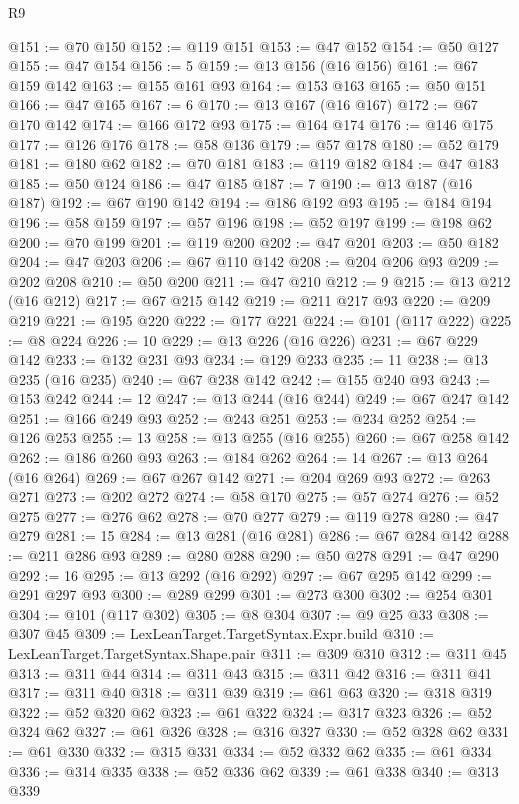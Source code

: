 \begin{lexlean}{R9}
\begin{coremodule}
@151 := @70 @150
@152 := @119 @151
@153 := @47 @152
@154 := @50 @127
@155 := @47 @154
@156 := 5
@159 := @13 @156 (@16 @156)
@161 := @67 @159 @142
@163 := @155 @161 @93
@164 := @153 @163
@165 := @50 @151
@166 := @47 @165
@167 := 6
@170 := @13 @167 (@16 @167)
@172 := @67 @170 @142
@174 := @166 @172 @93
@175 := @164 @174
@176 := @146 @175
@177 := @126 @176
@178 := @58 @136
@179 := @57 @178
@180 := @52 @179
@181 := @180 @62
@182 := @70 @181
@183 := @119 @182
@184 := @47 @183
@185 := @50 @124
@186 := @47 @185
@187 := 7
@190 := @13 @187 (@16 @187)
@192 := @67 @190 @142
@194 := @186 @192 @93
@195 := @184 @194
@196 := @58 @159
@197 := @57 @196
@198 := @52 @197
@199 := @198 @62
@200 := @70 @199
@201 := @119 @200
@202 := @47 @201
@203 := @50 @182
@204 := @47 @203
@206 := @67 @110 @142
@208 := @204 @206 @93
@209 := @202 @208
@210 := @50 @200
@211 := @47 @210
@212 := 9
@215 := @13 @212 (@16 @212)
@217 := @67 @215 @142
@219 := @211 @217 @93
@220 := @209 @219
@221 := @195 @220
@222 := @177 @221
@224 := @101 (@117 @222)
@225 := @8 @224
@226 := 10
@229 := @13 @226 (@16 @226)
@231 := @67 @229 @142
@233 := @132 @231 @93
@234 := @129 @233
@235 := 11
@238 := @13 @235 (@16 @235)
@240 := @67 @238 @142
@242 := @155 @240 @93
@243 := @153 @242
@244 := 12
@247 := @13 @244 (@16 @244)
@249 := @67 @247 @142
@251 := @166 @249 @93
@252 := @243 @251
@253 := @234 @252
@254 := @126 @253
@255 := 13
@258 := @13 @255 (@16 @255)
@260 := @67 @258 @142
@262 := @186 @260 @93
@263 := @184 @262
@264 := 14
@267 := @13 @264 (@16 @264)
@269 := @67 @267 @142
@271 := @204 @269 @93
@272 := @263 @271
@273 := @202 @272
@274 := @58 @170
@275 := @57 @274
@276 := @52 @275
@277 := @276 @62
@278 := @70 @277
@279 := @119 @278
@280 := @47 @279
@281 := 15
@284 := @13 @281 (@16 @281)
@286 := @67 @284 @142
@288 := @211 @286 @93
@289 := @280 @288
@290 := @50 @278
@291 := @47 @290
@292 := 16
@295 := @13 @292 (@16 @292)
@297 := @67 @295 @142
@299 := @291 @297 @93
@300 := @289 @299
@301 := @273 @300
@302 := @254 @301
@304 := @101 (@117 @302)
@305 := @8 @304
@307 := @9 @25 @33
@308 := @307 @45
@309 := LexLeanTarget.TargetSyntax.Expr.build
@310 := LexLeanTarget.TargetSyntax.Shape.pair
@311 := @309 @310
@312 := @311 @45
@313 := @311 @44
@314 := @311 @43
@315 := @311 @42
@316 := @311 @41
@317 := @311 @40
@318 := @311 @39
@319 := @61 @63
@320 := @318 @319
@322 := @52 @320 @62
@323 := @61 @322
@324 := @317 @323
@326 := @52 @324 @62
@327 := @61 @326
@328 := @316 @327
@330 := @52 @328 @62
@331 := @61 @330
@332 := @315 @331
@334 := @52 @332 @62
@335 := @61 @334
@336 := @314 @335
@338 := @52 @336 @62
@339 := @61 @338
@340 := @313 @339

\end{coremodule}
\end{lexlean}
